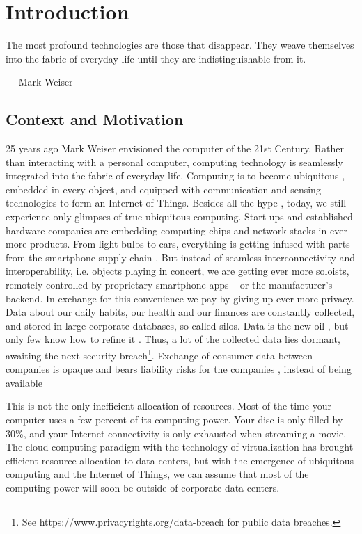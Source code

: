 \chapter{Introduction}
\label{sec:introduction}

\epigraph{The most profound technologies are those that disappear. They weave themselves into the
fabric of everyday life until they are indistinguishable from it.}{--- \textup{Mark Weiser}}

\section{Context and Motivation}

25 years ago Mark Weiser envisioned the computer of the 21st Century. Rather than interacting with a personal computer, computing technology is seamlessly integrated into the fabric of everyday life. Computing is to become ubiquitous \parencite{weiser:13609162}, embedded in every object, and equipped with communication and sensing technologies to form an Internet of Things.
Besides all the hype \parencite{Gartner:2015,manyika2015unlocking}, today, we still experience only glimpses of true ubiquitous computing. Start ups and established hardware companies are embedding computing chips and network stacks in ever more products. From light bulbs to cars, everything is getting infused with parts from the smartphone supply chain \parencite{Evans:2015,Evans:2016}. But instead of seamless interconnectivity and interoperability, i.e. objects playing in concert, we are getting ever more soloists, remotely controlled by proprietary smartphone apps -- or the manufacturer's backend. In exchange for this convenience we pay by giving up ever more privacy. Data about our daily habits, our health and our finances are constantly collected, and stored in large corporate databases, so called silos. Data is the new oil \parencite{schwab2011personal}, but only few know how to refine it \parencite{manyika2015unlocking}. Thus, a lot of the collected data lies dormant, awaiting the next security breach\footnote{See https://www.privacyrights.org/data-breach for public data breaches.}. Exchange of consumer data between companies is opaque and bears liability risks for the companies \parencite{ISI:000330253700010}, instead of being available 

This is not the only inefficient allocation of resources. Most of the time your computer uses a few percent of its computing power. Your disc is only filled by 30\%, and your Internet connectivity is only exhausted when streaming a movie. The cloud computing paradigm \parencite{Hayes:2008:CC:1364782.1364786,Armbrust:2010:VCC:1721654.1721672} with the technology of virtualization \parencite{barham2003xen} has brought efficient resource allocation to data centers, but with the emergence of ubiquitous computing and the Internet of Things, we can assume that most of the computing power will soon be outside of corporate data centers. 

